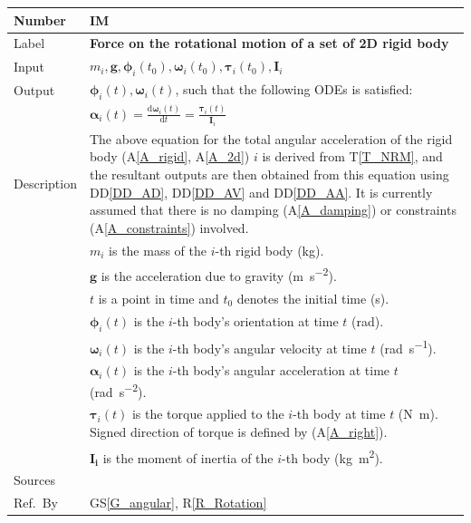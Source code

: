 \documentclass[12pt]{article}
\newcommand{\colAwidth}{0.13\textwidth}
\newcommand{\colBwidth}{0.82\textwidth}
\newcommand{\aref}[1]{A\ref{#1}}
\newcounter{instnum} %
\newcommand{\dt}{\mathrm{d}t}
\begin{document}
\noindent
\begin{minipage}{\textwidth}
	\renewcommand*{\arraystretch}{1.5}
	\begin{tabular}{| p{\colAwidth} | p{\colBwidth}|}
		\hline
		\rowcolor[gray]{0.9}
		Number & IM{instnum}\theinstnum \label{IM_FR}\\
		\hline
		Label & \bf Force on the rotational motion of a  set of 2D rigid body \\
		\hline
		Input &$m_i, \mathbf{g}, \boldsymbol{\phi}_i(t_0), \boldsymbol{\omega}_i(t_0), \boldsymbol{\tau}_i(t_0), \mathbf{I}_i$ \\
		\hline
		Output & $\boldsymbol{\phi}_i(t), \boldsymbol{\omega}_i(t)$, such that the following ODEs is satisfied: \\
		& $\boldsymbol{\alpha}_i(t) = \frac{\mathrm{d}\boldsymbol{\omega}_i(t)}{\dt} = \frac{\boldsymbol{\tau}_i(t)}{\mathbf{I}_i} $ \\
		\hline
		Description &                                                                                                                     
		The above equation for the total angular acceleration of the rigid body (\aref{A_rigid}, \aref{A_2d}) $i$ is derived from T\ref{T_NRM}, and the resultant outputs are then obtained from this equation using DD\ref{DD_AD}, DD\ref{DD_AV} and DD\ref{DD_AA}. It is currently assumed that there is no damping (\aref{A_damping}) or constraints (\aref{A_constraints}) involved. \\
		& $m_i$ is the mass of the $i$-th rigid body (\si{\kilogram}). \\
		& $\mathbf{g}$ is the acceleration due to gravity (\si{\metre\per\second\tothe{2}}). \\
		& $t$ is a point in time and $t_0$ denotes the initial time (\si{\second}). \\
		& $\boldsymbol{\phi}_i(t)$ is the $i$-th body's orientation at time $t$ (\si{\radian}). \\
		& $\boldsymbol{\omega}_i(t)$ is the $i$-th body's angular velocity at time $t$ (\si{\radian\per\second}). \\
		& $\boldsymbol{\alpha}_i(t)$ is the $i$-th body's angular acceleration at time $t$ (\si{\radian\per\second\tothe{2}}). \\
		& $\boldsymbol{\tau}_i(t)$ is the torque applied to the $i$-th body at time $t$ (\si{\newton\metre}). Signed direction of torque is defined by (\aref{A_right}). \\
		& $\mathbf{I_i}$ is the moment of inertia of the $i$-th body (\si{\kilogram\metre\tothe{2}}). \\
		\hline
		Sources & \\
		\hline
		Ref.\ By & GS\ref{G_angular}, R\ref{R_Rotation} \\
		\hline
	\end{tabular}
\end{minipage}
\end{document}
